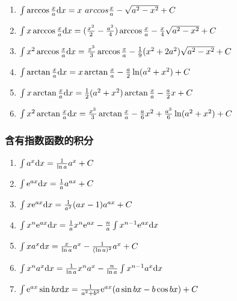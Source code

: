 \begin{small}
\begin {enumerate}
\item $ \int \arccos \frac{x}{a} \md x= x \ arccos \frac{x}{a} - \sqrt{a^2-x^2} +C $

\item $ \int x \arccos \frac{x}{a} \mathrm{d} x= (\frac{x^2}{2}-\frac{a^2}{4})\arccos \frac{x}{a} - \frac{x}{4} \sqrt{a^2-x^2}+C $

\item $ \int x^2 \arccos \frac{x}{a}\mathrm{d} x= \frac{x^3}{3}\arccos \frac{x}{a} - \frac{1}{9}(x^2+2a^2)\sqrt{a^2-x^2}+C$

\item $ \int \arctan \frac{x}{a} \mathrm{d} x=x \arctan \frac{x}{a}-\frac{a}{2}\ln (a^2+x^2)+C $

\item $ \int x\arctan \frac{x}{a} \mathrm{d} x = \frac{1}{2}(a^2+x^2)\arctan \frac{x}{a} -\frac{a}{2}x+C $

\item $ \int x^2 \arctan \frac{x}{a} \mathrm{d} x= \frac{x^3}{3} \arctan \frac{x}{a} - \frac{a}{6}x^2 + \frac{a^3}{6} \ln (a^2+x^2)+C $

\end {enumerate}

\subsubsection{含有指数函数的积分}

\begin{enumerate}

\item $ \int a^x \mathrm{d} x= \frac{1}{\ln a} a^x + C$

\item $ \int \mathrm{e} ^{ax}\mathrm{d} x=\frac{1}{a}a^{ax}+C $ 

\item $ \int x \mathrm{e}  ^ {ax} \mathrm{d} x=\frac{1}{a^2}(ax-1)a^{ax} +C $

\item $ \int x^n \mathrm{e} ^{ax} \mathrm{d} x=\frac{1}{a}x^n \mathrm{e} ^{ax}-\frac{n}{a} \int x^{n-1} \mathrm{e} ^ {ax} \mathrm{d} x $

\item $ \int x a^x \mathrm{d} x = \frac{x}{\ln a}a^x-\frac{1}{(\ln a)^2}a^x+C $

\item $ \int x^n a^x \mathrm{d} x= \frac{1}{\ln a}x^n a^x-\frac{n}{\ln a}\int x^{n-1}a^x \mathrm{d} x $

\item $ \int \mathrm{e} ^{ax} \sin bx \mathrm{d} x = \frac{1}{a^2+b^2}\mathrm{e} ^{ax}(a \sin bx - b \cos bx)+C $


\end{enumerate}
\end{small}
